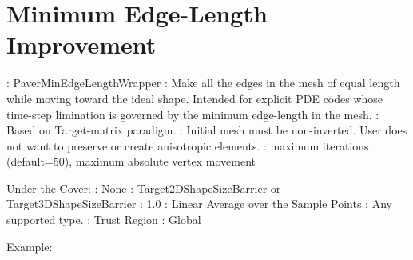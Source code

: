 \newpage

\section{Minimum Edge-Length Improvement} \label{sec:PaverMinEdgeLengthWrapper}

: PaverMinEdgeLengthWrapper \newline
{}: Make all the edges in the mesh of equal length while
moving toward the ideal shape. Intended for explicit PDE codes whose
time-step limination is governed by the minimum edge-length in the mesh. \newline
{}: Based on Target-matrix paradigm. \newline
{}: Initial mesh must be non-inverted. User does not want to preserve or create anisotropic elements. \newline
{}: maximum iterations (default=50), maximum absolute vertex movement \newline \newline

\noindent Under the Cover: \newline
{}: None \newline
{}:  Target2DShapeSizeBarrier or Target3DShapeSizeBarrier \newline
{}: 1.0 \newline
{}: Linear Average over the Sample Points \newline
{}: Any supported type.  \newline
{}: Trust Region \newline
{}: Global \newline

\noindent Example: \newline

